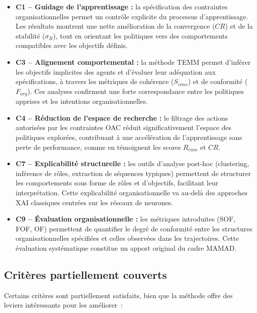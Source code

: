 \begin{itemize}
    \item \textbf{C1 – Guidage de l’apprentissage :} la spécification des contraintes organisationnelles permet un contrôle explicite du processus d’apprentissage. Les résultats montrent une nette amélioration de la convergence ($CR$) et de la stabilité ($\sigma_R$), tout en orientant les politiques vers des comportements compatibles avec les objectifs définis.

    \item \textbf{C3 – Alignement comportemental :} la méthode TEMM permet d’inférer les objectifs implicites des agents et d’évaluer leur adéquation aux spécifications, à travers les métriques de cohérence ($S_{cons}$) et de conformité ($F_{org}$). Ces analyses confirment une forte correspondance entre les politiques apprises et les intentions organisationnelles.

    \item \textbf{C4 – Réduction de l’espace de recherche :} le filtrage des actions autorisées par les contraintes OAC réduit significativement l’espace des politiques explorées, contribuant à une accélération de l’apprentissage sans perte de performance, comme en témoignent les scores $R_{cum}$ et $CR$.

    \item \textbf{C7 – Explicabilité structurelle :} les outils d’analyse post-hoc (clustering, inférence de rôles, extraction de séquences typiques) permettent de structurer les comportements sous forme de rôles et d’objectifs, facilitant leur interprétation. Cette explicabilité organisationnelle va au-delà des approches XAI classiques centrées sur les réseaux de neurones.

    \item \textbf{C9 – Évaluation organisationnelle :} les métriques introduites (SOF, FOF, OF) permettent de quantifier le degré de conformité entre les structures organisationnelles spécifiées et celles observées dans les trajectoires. Cette évaluation systématique constitue un apport original du cadre MAMAD.
\end{itemize}

\subsection*{Critères partiellement couverts}

Certains critères sont partiellement satisfaits, bien que la méthode offre des leviers intéressants pour les améliorer~:

